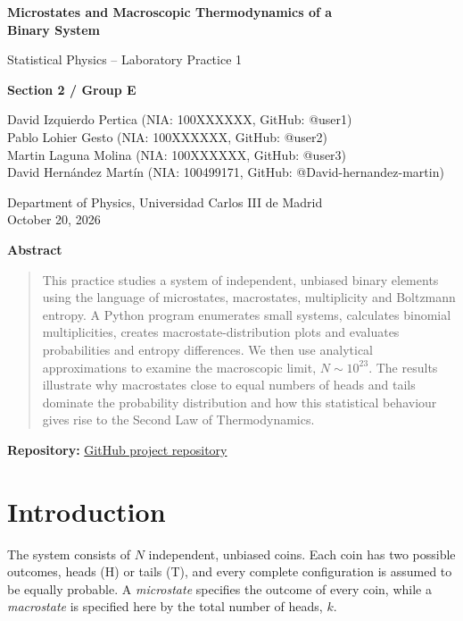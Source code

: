 \documentclass[10pt,a4paper]{article}
\begin{document}
\thispagestyle{plain}
\begin{center}
  {\LARGE\bfseries Microstates and Macroscopic Thermodynamics of a\\[2pt]
  Binary System\par}
  \vspace{4pt}
  {\large Statistical Physics -- Laboratory Practice 1\par}
  \vspace{12pt}
  {\large\bfseries Section 2 / Group E\par}
  David Izquierdo Pertica (NIA: 100XXXXXX, GitHub: @user1)\\
  Pablo Lohier Gesto (NIA: 100XXXXXX, GitHub: @user2)\\
  Martin Laguna Molina (NIA: 100XXXXXX, GitHub: @user3)\\
  David Hernández Martín (NIA: 100499171, GitHub: @David-hernandez-martin)
  \vspace{8pt}

  Department of Physics, Universidad Carlos III de Madrid\\
  October 20, 2026
\end{center}

\vspace{7pt}
\begin{center}
  \textbf{Abstract}
\end{center}
\begin{quote}
This practice studies a system of independent, unbiased binary elements using the language of microstates, macrostates, multiplicity and Boltzmann entropy. A Python program enumerates small systems, calculates binomial multiplicities, creates macrostate-distribution plots and evaluates probabilities and entropy differences. We then use analytical approximations to examine the macroscopic limit, $N\sim10^{23}$. The results illustrate why macrostates close to equal numbers of heads and tails dominate the probability distribution and how this statistical behaviour gives rise to the Second Law of Thermodynamics.
\end{quote}

\textbf{Repository:} \href{https://github.com/martinlagunamolina-commits/Laboratory-1-statistical-physics}{GitHub project repository}

\section{Introduction}
The system consists of $N$ independent, unbiased coins. Each coin has two possible outcomes, heads (H) or tails (T), and every complete configuration is assumed to be equally probable. A \emph{microstate} specifies the outcome of every coin, while a \emph{macrostate} is specified here by the total number of heads, $k$.
\end{document}

